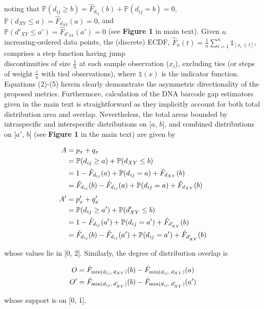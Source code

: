 \documentclass[12pt]{article}
\begin{document}
\noindent noting that $\mathbb{P}(d_{ij} \geq b) = \hat{F}_{d_{ij}}(b) +\mathbb{P}(d_{ij} = b) = 0$, $\mathbb{P}(d_{XY} \leq a) = \hat{F}_{d_{XY}}(a) = 0$, and \\ $\mathbb{P}(d'_{XY} \leq a') = \hat{F}_{d'_{XY}}(a') = 0$ (see \textbf{Figure 1} in main text). Given $n$ increasing-ordered data points, the (discrete) ECDF, $\hat{F}_n(t) = \frac{1}{n}\sum_{i = 1}^n\mathds{1}_{[x_i \leq t]}$, comprises a step function having jump \\ discontinuities of size $\frac{1}{n}$ at each sample observation ($x_i$), excluding ties (or steps of weight $\frac{i}{n}$ with tied observations), where $\mathds{1}(x)$ is the indicator function. Equations (2)-(5) herein clearly demonstrate the asymmetric directionality of the proposed metrics. Furthermore, calculation of the DNA barcode gap estimators given in the main text is straightforward as they implicitly account for both total distribution area and overlap. Nevertheless, the total areas bounded by intraspecific and interspecific distributions on [$a$, $b$], and combined distributions on [$a'$, $b$] (see \textbf{Figure 1} in the main text) are given by

\begin{align}
\notag A &= p_x + q_x \\ 
\notag &= \mathbb{P}(d_{ij} \geq a) + \mathbb{P}(d_{XY} \leq b) \\
\notag  &= 1 - \hat{F}_{d_{ij}}(a) + \mathbb{P}(d_{ij} = a) + \hat{F}_{d_{XY}}(b) \\
  &= \hat{F}_{d_{ij}}(b) - \hat{F}_{d_{ij}}(a) + \mathbb{P}(d_{ij} = a) + \hat{F}_{d_{XY}}(b) \\[1ex]
\notag A' &= p'_x + q'_x \\
\notag &= \mathbb{P}(d_{ij} \geq a') + \mathbb{P}(d'_{XY} \leq b) \\
\notag &= 1 - \hat{F}_{d_{ij}}(a') + \mathbb{P}(d_{ij} = a') + \hat{F}_{d'_{XY}}(b) \\
  &= \hat{F}_{d_{ij}}(b) - \hat{F}_{d_{ij}}(a') + \mathbb{P}(d_{ij} = a') + \hat{F}_{d'_{XY}}(b)
\end{align}

\noindent whose values lie in [0, 2]. Similarly, the degree of distribution overlap is

\begin{align}
\notag O &= \hat{F}_{\mathrm{min}(d_{ij}, \hspace{0.5mm} d_{XY})}(b) - \hat{F}_{\mathrm{min}(d_{ij}, \hspace{0.5mm} d_{XY})}(a) \\
\notag O' &= \hat{F}_{\mathrm{min}(d_{ij}, \hspace{0.5mm} d'_{XY})}(b) - \hat{F}_{\mathrm{min}(d_{ij}, \hspace{0.5mm} d'_{XY})}(a') 
\end{align}

\noindent whose support is on [0, 1].
\end{document}
